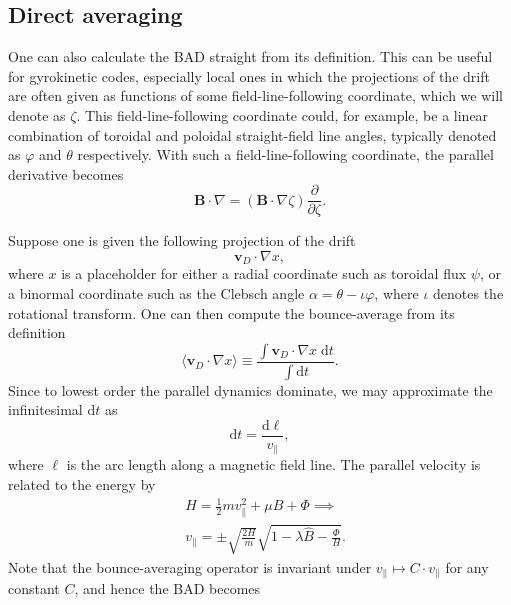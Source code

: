 \subsection{Direct averaging} \label{sec:direct-averaging}
One can also calculate the BAD straight from its definition. This can be useful for gyrokinetic codes, especially local ones in which the projections of the drift are often given as functions of some field-line-following coordinate, which we will denote as $\zeta$. This field-line-following coordinate could, for example, be a linear combination of toroidal and poloidal straight-field line angles, typically denoted as $\varphi$ and $\theta$ respectively. With such a field-line-following coordinate, the parallel derivative becomes
\begin{equation}
    \mathbf{B} \cdot \nabla = \left( \mathbf{B} \cdot \nabla \zeta \right) \frac{\partial}{\partial \zeta}.
\end{equation}
\par 
Suppose one is given the following projection of the drift
\begin{equation}
    \mathbf{v}_D \cdot \nabla x,
\end{equation}
where $x$ is a placeholder for either a radial coordinate such as toroidal flux $\psi$, or a binormal coordinate such as the Clebsch angle $\alpha = \theta - \iota \varphi$, where $\iota$ denotes the rotational transform. One can then compute the bounce-average from its definition
\begin{equation}
    \langle \mathbf{v}_D \cdot \nabla x \rangle \equiv \frac{ \int \mathbf{v}_D \cdot \nabla x \; \mathrm{d} t }{\int \mathrm{d} t}.
\end{equation}
Since to lowest order the parallel dynamics dominate, we may approximate the infinitesimal $\mathrm{d} t$ as
\begin{equation}
    \mathrm{d} t = \frac{\mathrm{d} \ell}{v_\parallel},
\end{equation}
where $\ell$ is the arc length along a magnetic field line. The parallel velocity is related to the energy by\begin{equation}
\begin{aligned}
    & H = \frac{1}{2}mv_\parallel^2 + \mu B + \Phi \implies \\
    & v_\parallel = \pm \sqrt{\frac{2H}{m}} \sqrt{1 - \lambda \hat{B} - \frac{\Phi}{H}}.
\end{aligned}
\end{equation}
Note that the bounce-averaging operator is invariant under $v_\parallel \mapsto C \cdot v_\parallel$ for any constant $C$, and hence the BAD becomes
